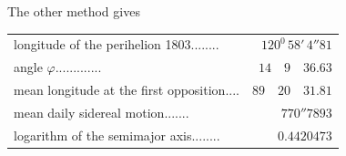 The other method gives
\begin{center}\fontsize{9}{11}\selectfont
\begin{tabular}{@{}p{.69\linewidth}@{\quad}r@{}}
longitude of the perihelion 1803\hfill\mbox{.\hspace{.76em}.\hspace{.76em}.\hspace{.76em}.\hspace{.76em}.\hspace{.76em}.\hspace{.76em}.\hspace{.76em}.}&$120^0\,58'\,4''81$\\
angle $\varphi$\hfill\mbox{.\hspace{.76em}.\hspace{.76em}.\hspace{.76em}.\hspace{.76em}.\hspace{.76em}.\hspace{.76em}.\hspace{.76em}.\hspace{.76em}.\hspace{.76em}.\hspace{.76em}.\hspace{.76em}.\hspace{.76em}.}&$14\quad9\quad36.63$\\
mean longitude at the first opposition\hfill\mbox{.\hspace{.76em}.\hspace{.76em}.\hspace{.76em}.}&$89\quad20\quad31.81$\\
mean daily sidereal motion\hfill\mbox{.\hspace{.76em}.\hspace{.76em}.\hspace{.76em}.\hspace{.76em}.\hspace{.76em}.\hspace{.76em}.}&$770''7893$\\
logarithm of the semimajor axis\hfill\mbox{.\hspace{.76em}.\hspace{.76em}.\hspace{.76em}.\hspace{.76em}.\hspace{.76em}.\hspace{.76em}.\hspace{.76em}.}&$0.4420473$
\end{tabular}
\end{center}
